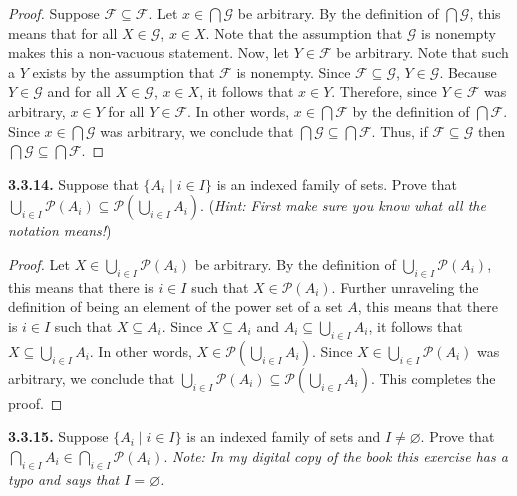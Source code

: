 \documentclass[12pt]{amsart}
\newenvironment{statement}[1]{\smallskip\noindent\color[rgb]{.6627, .3529, .6314} {\bf #1.}}{}
\theoremstyle{definition}
\theoremstyle{remark}
\begin{document}
\begin{proof}
Suppose $\mathcal{F} \subseteq \mathcal{F}$.
Let $x \in \bigcap \mathcal{G}$ be arbitrary.
By the definition of $\bigcap \mathcal{G}$, this means that for all $X \in \mathcal{G}$, $x \in X$.
Note that the assumption that $\mathcal{G}$ is nonempty makes this a non-vacuous statement.
Now, let $Y \in \mathcal{F}$ be arbitrary.
Note that such a $Y$ exists by the assumption that $\mathcal{F}$ is nonempty.
Since $\mathcal{F} \subseteq \mathcal{G}$, $Y \in \mathcal{G}$.
Because $Y \in \mathcal{G}$ and for all $X \in \mathcal{G}$, $x \in X$, it follows that $x \in Y$.
Therefore, since $Y \in \mathcal{F}$ was arbitrary, $x \in Y$ for all $Y \in \mathcal{F}$.
In other words, $x \in \bigcap \mathcal{F}$ by the definition of $\bigcap \mathcal{F}$.
Since $x \in \bigcap \mathcal{G}$ was arbitrary, we conclude that $\bigcap \mathcal{G} \subseteq \bigcap \mathcal{F}$.
Thus, if $\mathcal{F} \subseteq \mathcal{G}$ then $\bigcap \mathcal{G} \subseteq \bigcap \mathcal{F}$.
\end{proof}


\begin{statement}{3.3.14}
Suppose that $\{ A_i \mid i \in I \}$ is an indexed family of sets.
Prove that $\bigcup_{i \in I} \mathscr{P}(A_i) \subseteq \mathscr{P} \left( \bigcup_{i \in I} A_i \right)$.
(\emph{Hint: First make sure you know what all the notation means!})
\end{statement}

\begin{proof}
Let $X \in \bigcup_{i \in I} \mathscr{P}(A_i)$ be arbitrary.
By the definition of $\bigcup_{i \in I} \mathscr{P}(A_i)$, this means that there is $i \in I$ such that $X \in \mathscr{P}(A_i)$.
Further unraveling the definition of being an element of the power set of a set $A$, this means that there is $i \in I$ such that $X \subseteq A_i$.
Since $X \subseteq A_i$ and $A_i \subseteq \bigcup_{i \in I} A_i$, it follows that $X \subseteq \bigcup_{i \in I} A_i$.
In other words, $X \in \mathscr{P} \left( \bigcup_{i \in I} A_i \right)$.
Since $X \in \bigcup_{i \in I} \mathscr{P}(A_i)$ was arbitrary, we conclude that $\bigcup_{i \in I} \mathscr{P}(A_i) \subseteq \mathscr{P} \left( \bigcup_{i \in I} A_i \right)$.
This completes the proof.
\end{proof}


\begin{statement}{3.3.15}
Suppose $\{ A_i \mid i \in I \}$ is an indexed family of sets and $I \neq \varnothing$.
Prove that $\bigcap_{i \in I} A_i \in \bigcap_{i \in I} \mathscr{P}(A_i)$.
\emph{Note: In my digital copy of the book this exercise has a typo and says that $I = \varnothing$.}
\end{statement}
\end{document}
